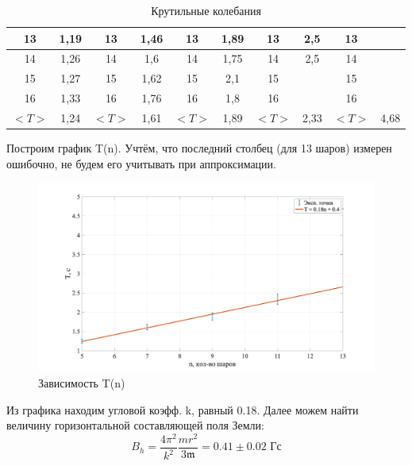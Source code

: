 \documentclass[a4paper, 12pt]{article}
\begin{document}
\begin{table}[h]
\begin{tabular}{|cccccccccc|}
	\multicolumn{1}{|c|}{13}     & \multicolumn{1}{c|}{1,19}    & \multicolumn{1}{c|}{13}     & \multicolumn{1}{c|}{1,46}     & \multicolumn{1}{c|}{13}     & \multicolumn{1}{c|}{1,89}    & \multicolumn{1}{c|}{13}     & \multicolumn{1}{c|}{2,5}      & \multicolumn{1}{c|}{13}     &       \\ \hline
	\multicolumn{1}{|c|}{14}     & \multicolumn{1}{c|}{1,26}    & \multicolumn{1}{c|}{14}     & \multicolumn{1}{c|}{1,6}      & \multicolumn{1}{c|}{14}     & \multicolumn{1}{c|}{1,75}    & \multicolumn{1}{c|}{14}     & \multicolumn{1}{c|}{2,5}      & \multicolumn{1}{c|}{14}     &       \\ \hline
	\multicolumn{1}{|c|}{15}     & \multicolumn{1}{c|}{1,27}    & \multicolumn{1}{c|}{15}     & \multicolumn{1}{c|}{1,62}     & \multicolumn{1}{c|}{15}     & \multicolumn{1}{c|}{2,1}     & \multicolumn{1}{c|}{15}     & \multicolumn{1}{c|}{}         & \multicolumn{1}{c|}{15}     &       \\ \hline
	\multicolumn{1}{|c|}{16}     & \multicolumn{1}{c|}{1,33}    & \multicolumn{1}{c|}{16}     & \multicolumn{1}{c|}{1,76}     & \multicolumn{1}{c|}{16}     & \multicolumn{1}{c|}{1,8}     & \multicolumn{1}{c|}{16}     & \multicolumn{1}{c|}{}         & \multicolumn{1}{c|}{16}     &       \\ \hline
	\multicolumn{1}{|c|}{$<T>$} & \multicolumn{1}{c|}{1,24} & \multicolumn{1}{c|}{$<T>$} & \multicolumn{1}{c|}{1,61} & \multicolumn{1}{c|}{$<T>$} & \multicolumn{1}{c|}{1,89} & \multicolumn{1}{c|}{$<T>$} & \multicolumn{1}{c|}{2,33} & \multicolumn{1}{c|}{$<T>$} & 4,68 \\ \hline
	\end{tabular}
	\caption{Крутильные колебания}
	\label{tab:krutilnye}
	\end{table}

Построим график T(n). Учтём, что последний столбец (для 13 шаров) измерен ошибочно, не будем его учитывать при аппроксимации.
\begin{figure}[H]
    \centering
    \includegraphics[width=1\textwidth]{plot1}
    \caption{Зависимость T(n)}
    \label{fig:plot1}
\end{figure}
Из графика находим угловой коэфф. k, равный 0.18. Далее можем найти величину горизонтальной составляющей поля Земли:
\begin{equation}
	B_h = \frac{4 \pi^2}{k^2} \frac{mr^2}{3\mathfrak{m}} = 0.41 \pm 0.02 \text{ Гс}
\end{equation}
\end{document}
